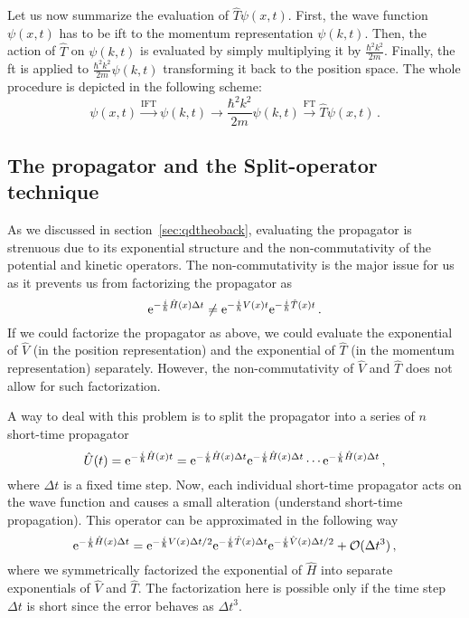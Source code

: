 Let us now summarize the evaluation of $\hat{T}\psi(x,t)$. First, the wave function $\psi(x,t)$ has to be \acrshort{ift} to the momentum representation $\psi(k,t)$. Then, the action of $\hat{T}$ on $\psi(k,t)$ is evaluated by simply multiplying it by $\frac{\hbar^2 k^2}{2m}$. Finally, the \acrshort{ft} is applied to $\frac{\hbar^2 k^2}{2m} \psi(k,t)$ transforming it back to the position space. The whole procedure is depicted in the following scheme:
\begin{equation}
    \psi(x,t) \stackrel{\mathrm{IFT}}{\longrightarrow} \psi(k,t) \longrightarrow \frac{\hbar^2 k^2}{2m} \psi(k,t) \stackrel{\mathrm{FT}}{\longrightarrow} \hat{T}\psi(x,t) \, .
\end{equation}

\subsection{The propagator and the Split-operator technique}

As we discussed in section~\ref{sec:qdtheoback}, evaluating the propagator is strenuous due to its exponential structure and the non-commutativity of the potential and kinetic operators. The non-commutativity is the major issue for us as it prevents us from factorizing the propagator as
\begin{equation}
    \mathrm{e}^{-\frac{i}{\hbar}\hat{H}(x)\Delta t} \neq \mathrm{e}^{-\frac{i}{\hbar}V(x)t}\mathrm{e}^{-\frac{i}{\hbar}\hat{T}(x)t}\, .
\end{equation}
If we could factorize the propagator as above, we could evaluate the exponential of $\hat{V}$ (in the position representation) and the exponential of $\hat{T}$ (in the momentum representation) separately. However, the non-commutativity of $\hat{V}$ and $\hat{T}$ does not allow for such factorization.

A way to deal with this problem is to split the propagator into a series of $n$ short-time propagator
\begin{equation}
    \hat{U}(t) = \mathrm{e}^{-\frac{i}{\hbar}\hat{H}(x)t} = \mathrm{e}^{-\frac{i}{\hbar}\hat{H}(x)\Delta t} \mathrm{e}^{-\frac{i}{\hbar}\hat{H}(x)\Delta t} \cdots \mathrm{e}^{-\frac{i}{\hbar}\hat{H}(x)\Delta t} \, ,
    \label{eq:U4}
\end{equation}
where $\Delta t$ is a fixed time step. Now, each individual short-time propagator acts on the wave function and causes a small alteration (understand short-time propagation). This operator can be approximated in the following way
\begin{equation}
    \mathrm{e}^{-\frac{i}{\hbar}\hat{H}(x)\Delta t} = \mathrm{e}^{-\frac{i}{\hbar}V(x)\Delta t/2}\mathrm{e}^{-\frac{i}{\hbar}\hat{T}(x)\Delta t}\mathrm{e}^{-\frac{i}{\hbar}\hat{V}(x)\Delta t/2} + \mathcal{O}(\Delta t^3) \, ,
\end{equation}
where we symmetrically factorized the exponential of $\hat{H}$ into separate exponentials of $\hat{V}$ and $\hat{T}$. The factorization here is possible only if the time step $\Delta t$ is short since the error behaves as $\Delta t^3$. 

